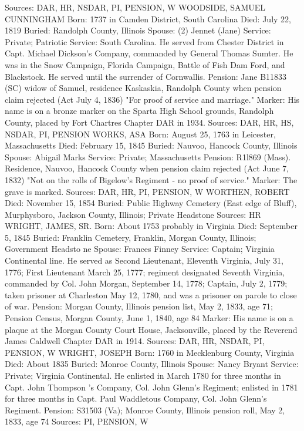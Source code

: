 Sources: DAR, HR, NSDAR, PI, PENSION, W 
WOODSIDE, SAMUEL CUNNINGHAM 
Born: 1737 in Camden District, South Carolina
Died:  July 22, 1819 
Buried: Randolph County, Illinois 
Spouse: (2) Jennet (Jane)  
Service: Private; Patriotic
Service: South Carolina. He served from Chester Dis­trict in Capt. Michael Dickson's Company, commanded by General Thomas Sumter. He was in the Snow Campaign, Florida Campaign, Battle of Fish Dam Ford, and Blackstock. He served until the surrender of Cornwallis. 
Pension: Jane B11833 (SC) widow of Samuel, residence Kaskaskia, Randolph County when pension claim rejected (Act July 4, 1836) "For proof of service and marriage." 
Marker: His name is on a bronze marker on the Sparta High School grounds, Randolph County, placed by Fort Chartres Chapter DAR in 1934. 
Sources: DAR, HR, HS, NSDAR, PI, PENSION 
WORKS, ASA 
Born: August 25, 1763 in Leicester, Massachusetts
Died: February 15, 1845 
Buried: Nauvoo, Hancock County, Illinois 
Spouse: Abigail Marks
Service: Private; Massachusetts 
Pension: R1l869 (Mass). Residence, Nauvoo, Hancock County when pension claim rejected (Act June 7, 1832) "Not on the rolls of Bigelow's Regiment - no proof of service."
Marker: The grave is marked. 
Sources: DAR, HR, PI, PENSION, W 
WORTHEN, ROBERT 
Died: November 15, 1854 
Buried: Public Highway Cemetery (East edge of Bluff), Murphysboro, Jackson County, Illinois; Private Headstone 
Sources: HR 
WRIGHT, JAMES, SR. 
Born: About 1753 probably in Virginia
Died: September 5, 1845 
Buried: Franklin Cemetery, Franklin, Morgan County, Illinois; Government Head­sto ne Spouse: Frances Finney
Service: Captain; Virginia Continental line. He served as Second Lieutenant, Eleventh Virginia, July 31, 1776; First Lieutenant March 25, 1777; regiment designated Seventh Virginia, commanded by Col. John Morgan, September 14, 1778; Captain, July 2, 1779; taken prisoner at Charleston May 12, 1780, and was a prisoner on parole to close of war. 
Pension: Morgan County, Illinois pension list, May 2, 1833, age 71; Pension Census, Morgan County, June 1, 1840, age 84
Marker: His name is on a plaque at the Morgan County Court House, Jackson­ville, placed by the Reverend James Caldwell Chapter DAR in 1914. Sources: DAR, HR, NSDAR, PI, PENSION, W 
WRIGHT, JOSEPH 
Born: 1760 in Mecklenburg County, Virginia
Died: About 1835 
Buried: Monroe County, Illinois 
Spouse: Nancy Bryant 
Service: Private; Virginia Continental. He enlisted in March 1780 for three months in Capt. John Thompson 's Company, Col. John Glenn's Regiment; enlisted in 1781 for three months in Capt. Paul Waddletous Company, Col. John Glenn's Regiment. 
Pension: S31503 (Va); Monroe County, Illinois pension roll, May 2, 1833, age 74 
Sources: PI, PENSION, W 

